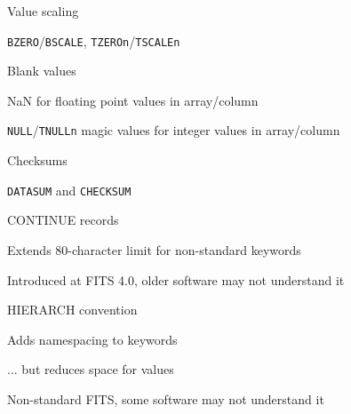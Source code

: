 \documentclass[20pt,landscape]{foils}
\begin{document}
\begin{list1}
  \item Value scaling
  \begin{list2}
    \item {\color{brown}\tt BZERO}/{\color{brown}\tt BSCALE},
          {\color{brown}\tt TZEROn}/{\color{brown}\tt TSCALEn}
  \end{list2}
  \item Blank values
  \begin{list2}
    \item NaN for floating point values in array/column
    \item {\color{brown}\tt NULL}/{\color{brown}\tt TNULLn}
          magic values for integer values in array/column
  \end{list2}
  \item Checksums
  \begin{list2}
    \item {\color{brown}\tt DATASUM} and {\color{brown}\tt CHECKSUM}
  \end{list2}
  \item CONTINUE records
  \begin{list2}
    \item Extends 80-character limit for non-standard keywords
    \item Introduced at FITS 4.0, older software may not understand it
  \end{list2}
  \item HIERARCH convention
  \begin{list2}
    \item Adds namespacing to keywords
    \item ... but reduces space for values
    \item Non-standard FITS, some software may not understand it
  \end{list2}
\end{list1}


\end{document}
